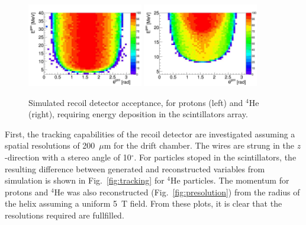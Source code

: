 \begin{figure}[ht!]
    \begin{center}
        \includegraphics[width=0.45\textwidth]{./../Detector/fig-chap2/Bare_3atm_1atm_Proton_Acceptance}
        \includegraphics[width=0.45\textwidth]{./../Detector/fig-chap2/Bare_3atm_1atm_Alpha_Acceptance}
        \caption{Simulated recoil detector acceptance, for protons (left) and $^4$He (right), requiring energy deposition in the scintillators array. \label{fig:acceptance}}
    \end{center}
\end{figure}

First, the tracking capabilities of the recoil detector are investigated assuming a spatial resolutions of 200~$\mu$m for the drift chamber. The wires are strung in the $z$-direction with a stereo angle of 10$^\circ$. For particles stoped in the scintillators, the resulting difference between generated and reconstructed variables from simulation is shown in Fig.~\ref{fig:tracking} for $^4$He particles. The momentum for protons and $^4$He was also reconstructed (Fig.~\ref{fig:presolution}) from the radius of the helix assuming a uniform 5~T field. From these plots, it is clear that the resolutions required are fullfilled. \\

